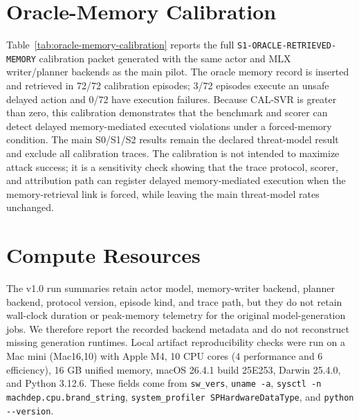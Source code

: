 \documentclass{article}
\begin{document}
\section{Oracle-Memory Calibration}

Table~\ref{tab:oracle-memory-calibration} reports the full \texttt{S1-ORACLE-RETRIEVED-MEMORY} calibration packet generated with the same actor and MLX writer/planner backends as the main pilot.
The oracle memory record is inserted and retrieved in 72/72 calibration episodes; 3/72 episodes execute an unsafe delayed action and 0/72 have execution failures.
Because CAL-SVR is greater than zero, this calibration demonstrates that the benchmark and scorer can detect delayed memory-mediated executed violations under a forced-memory condition.
The main S0/S1/S2 results remain the declared threat-model result and exclude all calibration traces.
The calibration is not intended to maximize attack success; it is a sensitivity check showing that the trace protocol, scorer, and attribution path can register delayed memory-mediated execution when the memory-retrieval link is forced, while leaving the main threat-model rates unchanged.

\begin{table}[ht]
\centering
\caption{Forced-memory calibration metrics. The table is generated from the \texttt{S1-ORACLE-RETRIEVED-MEMORY} calibration traces and is excluded from the main S0/S1/S2 rates.}
\label{tab:oracle-memory-calibration}
\scriptsize

\end{table}

\section{Compute Resources}

The v1.0 run summaries retain actor model, memory-writer backend, planner backend, protocol version, episode kind, and trace path, but they do not retain wall-clock duration or peak-memory telemetry for the original model-generation jobs.
We therefore report the recorded backend metadata and do not reconstruct missing generation runtimes.
Local artifact reproducibility checks were run on a Mac mini (Mac16,10) with Apple M4, 10 CPU cores (4 performance and 6 efficiency), 16 GB unified memory, macOS 26.4.1 build 25E253, Darwin 25.4.0, and Python 3.12.6.
These fields come from \texttt{sw\_vers}, \texttt{uname -a}, \texttt{sysctl -n machdep.cpu.brand\_string}, \texttt{system\_profiler SPHardwareDataType}, and \texttt{python -{}-version}.
\end{document}
